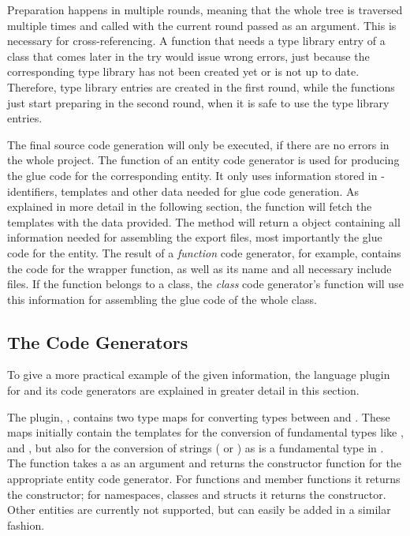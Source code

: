 Preparation happens in multiple rounds, meaning that the whole tree is traversed multiple times and  called with the current round passed as an argument. This is necessary for cross-referencing. A function that needs a type library entry of a class that comes later in the try would issue wrong errors, just because the corresponding type library has not been created yet or is not up to date. Therefore, type library entries are created in the first round, while the functions just start preparing in the second round, when it is safe to use the type library entries.

The final source code generation will only be executed, if there are no errors in the whole project. The  function of an entity code generator is used for producing the glue code for the corresponding entity.  It only uses information stored in  - identifiers, templates and other data needed for glue code generation. As explained in more detail in the following section, the  function will fetch the templates with the data provided. The method will return a  object containing all information needed for assembling the export files, most importantly the glue code for the entity. The result of a \textit{function} code generator, for example, contains the code for the wrapper function, as well as its name and all necessary include files. If the function belongs to a class, the \textit{class} code generator's  function will use this information for assembling the glue code of the whole class.

\subsection{The  Code Generators}

To give a more practical example of the given information, the language plugin for  and its code generators are explained in greater detail in this section.

The plugin, , contains two type maps for converting types between  and . These maps initially contain the templates for the conversion of fundamental types like ,  and , but also for the conversion of strings ( or ) as  is a fundamental type in . The function  takes a  as an argument and returns the constructor function for the appropriate entity code generator. For functions and member functions it returns the  constructor; for namespaces, classes and structs it returns the  constructor. Other  entities are currently not supported, but can easily be added in a similar fashion.

